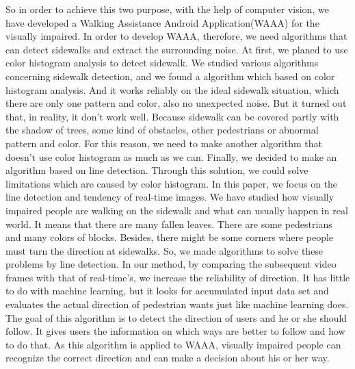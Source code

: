 {\newline
So in order to achieve this two purpose, with the help of computer vision, we have developed a Walking Assistance Android Application(WAAA) for the visually impaired. In order to develop WAAA, therefore, we need algorithms that can detect sidewalks and extract the surrounding noise. At first, we planed to use color histogram analysis to detect sidewalk. We studied various algorithms concerning sidewalk detection, and we found a algorithm which based on color histogram analysis. And it works reliably on the ideal sidewalk situation, which there are only one pattern and color, also no unexpected noise. But it turned out that, in reality, it don’t work well. Because sidewalk can be covered partly with the shadow of trees, some kind of obstacles, other pedestrians or abnormal pattern and color. For this reason, we need to make another algorithm that doesn’t use color histogram as much as we can. Finally, we decided to make an algorithm based on line detection. Through this solution, we could solve limitations which are caused by color histogram.
\newline
In this paper, we focus on the line detection and tendency of real-time images. We have studied how visually impaired people are walking on the sidewalk and what can usually happen in real world. It means that there are many fallen leaves. There are some pedestrians and many colors of blocks. Besides, there might be some corners where people must turn the direction at sidewalks. So, we made algorithms to solve these problems by line detection.
\newline
In our method, by comparing the subsequent video frames with that of real-time's, we increase the reliability of direction. It has little to do with machine learning, but it looks for accumulated input data set and evaluates the actual direction of pedestrian wants just like machine learning does. The goal of this algorithm is to detect the direction of users and he or she should follow. It gives users the information on which ways are better to follow and how to do that. As this algorithm is applied to WAAA, visually impaired people can recognize the correct direction and can make a decision about his or her way.}